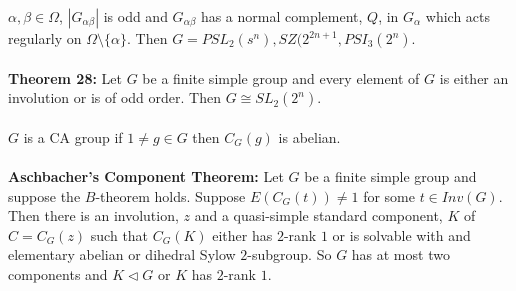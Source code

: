 $\alpha, \beta \in \Omega$, $|G_{\alpha \beta}|$ is odd and $G_{\alpha \beta}$ has a normal
complement, $Q$, in $G_{\alpha}$ which acts regularly on $\Omega \setminus \{ \alpha \}$.
Then $G = PSL_2(s^n), SZ(2^{2n+1}, PSI_3(2^n)$.
\\
\\
{\bf Theorem 28:} Let $G$ be a finite simple group and every element of $G$ is either an involution
or is of odd order.  Then $G \cong SL_2(2^n)$.
\\
\\
$G$ is a CA group if $1 \ne g \in G$ then $C_G(g)$ is abelian.
\\
\\
{\bf Aschbacher's Component Theorem:} Let $G$ be a finite simple group and suppose the
$B$-theorem holds.  Suppose $E(C_G(t)) \ne 1$ for some $t \in Inv(G)$.  Then there is
an involution, $z$ and a quasi-simple standard component, $K$ of $C=C_G(z)$ such that
$C_G(K)$ either has $2$-rank $1$ or is solvable with and elementary abelian or dihedral
Sylow $2$-subgroup.  So $G$ has at most two components and $K \lhd G$ or $K$  has $2$-rank $1$.
